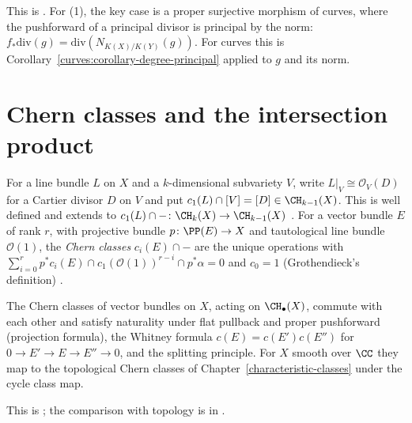 This is \cite[Theorem 1.4 and Theorem 1.7]{fulton-intersection}. For (1), the key case is a proper surjective morphism of curves, where the pushforward of a principal divisor is principal
by the norm: $f_*\mathrm{div}(g) = \mathrm{div}(N_{K(X)/K(Y)}(g))$. For curves this is Corollary~\ref{curves:corollary-degree-principal} applied to $g$ and its norm.

\section{Chern classes and the intersection product}\label{intersection-theory:section-intersection-product}

\begin{definition}\label{intersection-theory:definition-chern-classes}
For a line bundle $L$ on $X$ and a $k$-dimensional subvariety $V$, write $L|_V \cong \mathcal{O}_V(D)$ for a Cartier divisor $D$ on $V$ and put $c_1(L) \cap [V] = [D] \in \CH_{k-1}(X)$. This
is well defined and extends to $c_1(L) \cap - \colon \CH_k(X) \to \CH_{k-1}(X)$ \cite[Chapter 2]{fulton-intersection}. For a vector bundle $E$ of rank $r$, with projective bundle
$p \colon \PP(E) \to X$ and tautological line bundle $\mathcal{O}(1)$, the \emph{Chern classes} $c_i(E) \cap -$ are the unique operations with
$\sum_{i=0}^r p^*c_i(E) \cap c_1(\mathcal{O}(1))^{r-i} \cap p^*\alpha = 0$ and $c_0 = 1$ (Grothendieck's definition) \cite[Chapter 3]{fulton-intersection}.
\end{definition}

\begin{theorem}\label{intersection-theory:theorem-chern-properties}
The Chern classes of vector bundles on $X$, acting on $\CH_\bullet(X)$, commute with each other and satisfy naturality under flat pullback and proper pushforward (projection formula),
the Whitney formula $c(E) = c(E')c(E'')$ for $0 \to E' \to E \to E'' \to 0$, and the splitting principle. For $X$ smooth over $\CC$ they map to the topological Chern classes of
Chapter~\ref{characteristic-classes} under the cycle class map.
\end{theorem}

This is \cite[Theorem 3.2]{fulton-intersection}; the comparison with topology is in \cite[Chapter 19]{fulton-intersection}.

